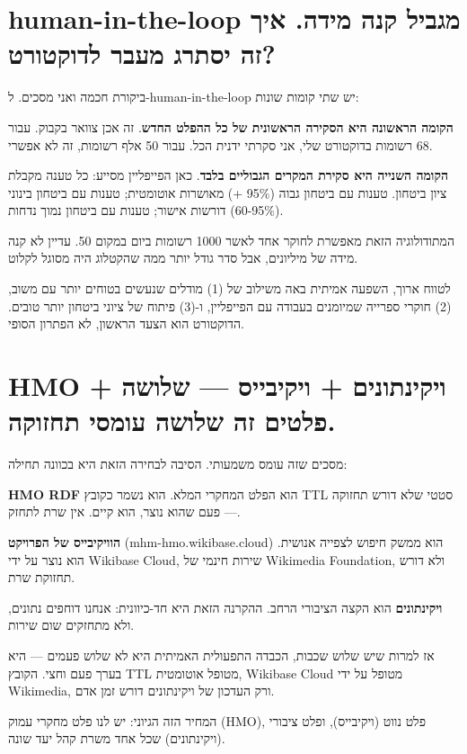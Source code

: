 \documentclass[12pt,a4paper]{article}
\begin{document}
\section{\texthebrew{human-in-the-loop מגביל קנה מידה. איך זה יסתרג מעבר לדוקטורט?}}
\begin{hebrew}
ביקורת חכמה ואני מסכים. ל-human-in-the-loop יש שתי קומות שונות:
\par
\textbf{הקומה הראשונה היא הסקירה הראשונית של כל ההפלט החדש}. זה אכן צוואר בקבוק. עבור 68 רשומות בדוקטורט שלי, אני סקרתי ידנית הכל. עבור 50 אלף רשומות, זה לא אפשרי.
\par
\textbf{הקומה השנייה היא סקירת המקרים הגבוליים בלבד}. כאן הפייפליין מסייע: כל טענה מקבלת ציון ביטחון. טענות עם ביטחון גבוה (95\% +) מאושרות אוטומטית; טענות עם ביטחון בינוני (60-95\%) דורשות אישור; טענות עם ביטחון נמוך נדחות.
\par
המתודולוגיה הזאת מאפשרת לחוקר אחד לאשר 1000 רשומות ביום במקום 50. עדיין לא קנה מידה של מיליונים, אבל סדר גודל יותר ממה שהקטלוג היה מסוגל לקלוט.
\par
לטווח ארוך, השפעה אמיתית באה משילוב של (1) מודלים שנעשים בטוחים יותר עם משוב, (2) חוקרי ספרייה שמיומנים בעבודה עם הפייפליין, ו-(3) פיתוח של ציוני ביטחון יותר טובים. הדוקטורט הוא הצעד הראשון, לא הפתרון הסופי.
\end{hebrew}


\section{\texthebrew{HMO + ויקינתונים + ויקיבייס — שלושה פלטים זה שלושה עומסי תחזוקה.}}
\begin{hebrew}
מסכים שזה עומס משמעותי. הסיבה לבחירה הזאת היא בכוונה תחילה:
\par
\textbf{HMO RDF} הוא הפלט המחקרי המלא. הוא נשמר כקובץ TTL סטטי שלא דורש תחזוקה — פעם שהוא נוצר, הוא קיים. אין שרת לתחזק.
\par
\textbf{הוויקיבייס של הפרויקט} (mhm-hmo.wikibase.cloud) הוא ממשק חיפוש לצפייה אנושית. הוא נוצר על ידי Wikibase Cloud, שירות חינמי של Wikimedia Foundation, ולא דורש תחזוקת שרת.
\par
\textbf{ויקינתונים} הוא הקצה הציבורי הרחב. ההקרנה הזאת היא חד-כיוונית: אנחנו דוחפים נתונים, ולא מתחזקים שום שירות.
\par
אז למרות שיש שלוש שכבות, הכבדה התפעולית האמיתית היא לא שלוש פעמים — היא בערך פעם וחצי. הקובץ TTL מטופל אוטומטית, Wikibase Cloud מטופל על ידי Wikimedia, ורק העדכון של ויקינתונים דורש זמן אדם.
\par
המחיר הזה הגיוני: יש לנו פלט מחקרי עמוק (HMO), פלט נווט (ויקיבייס), ופלט ציבורי (ויקינתונים) שכל אחד משרת קהל יעד שונה.
\end{hebrew}
\end{document}
